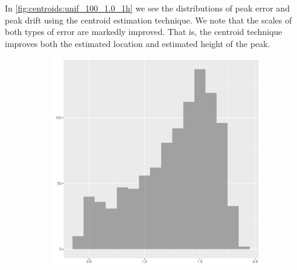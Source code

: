 In \cref{fig:centroids:unif_100_1.0_1h} we see the distributions of \gls{peak error} and \gls{peak drift} using the centroid estimation technique.
We note that the scales of both types of error are markedly improved.
That is, the centroid technique improves both the estimated location and estimated height of the peak.

\begin{figure}[htbp]
    \centering
    \begin{subfigure}[t]{0.45\textwidth}
        \includegraphics[width=\textwidth]{output/bandwidths-x1}
        \label{fig:bandwidths:unif_100_1.0_1h:x1}
    \end{subfigure}
    \begin{subfigure}[t]{0.45\textwidth}

\end{subfigure}
\end{figure}

